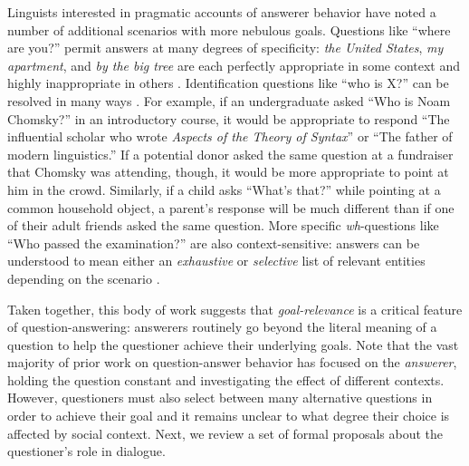 \documentclass[12pt, floatsintext, jou]{apa6}
\begin{document}

Linguists interested in pragmatic accounts of answerer behavior have noted a number of additional scenarios with more nebulous goals. 
Questions like ``where are you?'' permit answers at many degrees of specificity: \emph{the United States}, \emph{my apartment}, and \emph{by the big tree} are each perfectly appropriate in some context and highly inappropriate in others \cite{Potts12_CardsDialogueCorpus}. 
Identification questions like ``who is X?'' can be resolved in many ways  \cite{BoerLycan75_KnowingWho, Gerbrandy00_Identity, Aloni05_ConceptualCovers}. 
For example, if an undergraduate asked ``Who is Noam Chomsky?'' in an introductory course, it would be appropriate to respond ``The influential scholar who wrote \emph{Aspects of the Theory of Syntax}'' or ``The father of modern linguistics.'' 
If a potential donor asked the same question at a fundraiser that Chomsky was attending, though, it would be more appropriate to point at him in the crowd. 
Similarly, if a child asks ``What's that?'' while pointing at a common household object, a parent's response will be much different than if one of their adult friends asked the same question. 
More specific \emph{wh}-questions like ``Who passed the examination?'' are also context-sensitive: answers can be understood to mean either an \emph{exhaustive} or \emph{selective} list of relevant entities depending on the scenario \cite{SchulzVanRooij06_ExhaustiveInterpretation}.

Taken together, this body of work suggests that \emph{goal-relevance} is a critical feature of question-answering: answerers routinely go beyond the literal meaning of a question to help the questioner achieve their underlying goals. Note that the vast majority of prior work on question-answer behavior has focused on the \emph{answerer}, holding the question constant and investigating the effect of different contexts. 
However, questioners must also select between many alternative questions in order to achieve their goal and it remains unclear to what degree their choice is affected by social context. Next, we review a set of formal proposals about the questioner's role in dialogue.  
\end{document}

